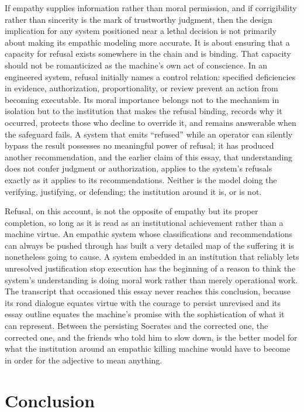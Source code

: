 \documentclass[11pt]{article}
\begin{document}
If empathy supplies information rather than moral permission, and if corrigibility rather than sincerity is the mark of trustworthy judgment, then the design implication for any system positioned near a lethal decision is not primarily about making its empathic modeling more accurate. It is about ensuring that a capacity for refusal exists somewhere in the chain and is binding. That capacity should not be romanticized as the machine's own act of conscience. In an engineered system, refusal initially names a control relation: specified deficiencies in evidence, authorization, proportionality, or review prevent an action from becoming executable. Its moral importance belongs not to the mechanism in isolation but to the institution that makes the refusal binding, records why it occurred, protects those who decline to override it, and remains answerable when the safeguard fails. A system that emits ``refused'' while an operator can silently bypass the result possesses no meaningful power of refusal; it has produced another recommendation, and the earlier claim of this essay, that understanding does not confer judgment or authorization, applies to the system's refusals exactly as it applies to its recommendations. Neither is the model doing the verifying, justifying, or defending; the institution around it is, or is not.

Refusal, on this account, is not the opposite of empathy but its proper completion, so long as it is read as an institutional achievement rather than a machine virtue. An empathic system whose classifications and recommendations can always be pushed through has built a very detailed map of the suffering it is nonetheless going to cause. A system embedded in an institution that reliably lets unresolved justification stop execution has the beginning of a reason to think the system's understanding is doing moral work rather than merely operational work. The transcript that occasioned this essay never reaches this conclusion, because its road dialogue equates virtue with the courage to persist unrevised and its essay outline equates the machine's promise with the sophistication of what it can represent. Between the persisting Socrates and the corrected one, the corrected one, and the friends who told him to slow down, is the better model for what the institution around an empathic killing machine would have to become in order for the adjective to mean anything.

\section{Conclusion}
\end{document}
